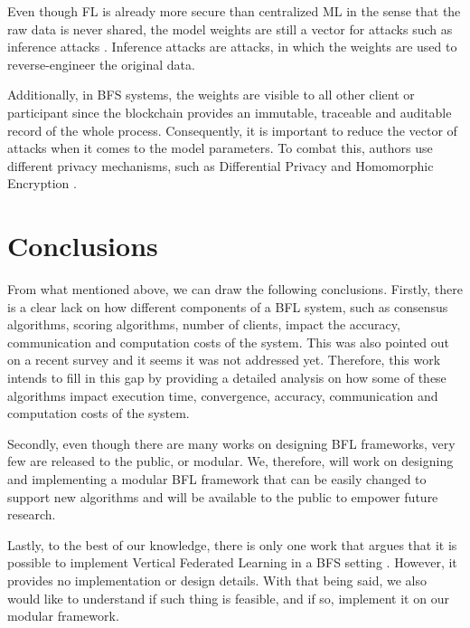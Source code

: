 Even though FL is already more secure than centralized ML in the sense that the raw data is never shared, the model weights are still a vector for attacks such as inference attacks \cite{10.1145/3298981}. Inference attacks are attacks, in which the weights are used to reverse-engineer the original data.

Additionally, in BFS systems, the weights are visible to all other client or participant since the blockchain provides an immutable, traceable and auditable record of the whole process. Consequently, it is important to reduce the vector of attacks when it comes to the model parameters. To combat this, authors use different privacy mechanisms, such as Differential Privacy \cite{10.48550/arxiv.2007.03856, Peyvandi2022, 9170559} and Homomorphic Encryption \cite{8945913, 8894364}.

\section{Conclusions}\label{related_work:conclusions}

From what mentioned above, we can draw the following conclusions. Firstly, there is a clear lack on how different components of a BFL system, such as consensus algorithms, scoring algorithms, number of clients, impact the accuracy, communication and computation costs of the system. This was also pointed out on a recent survey \cite{9403374} and it seems it was not addressed yet. Therefore, this work intends to fill in this gap by providing a detailed analysis on how some of these algorithms impact execution time, convergence, accuracy, communication and computation costs of the system.

Secondly, even though there are many works on designing BFL frameworks, very few are released to the public, or modular. We, therefore, will work on designing and implementing a modular BFL framework that can be easily changed to support new algorithms and will be available to the public to empower future research.

Lastly, to the best of our knowledge, there is only one work that argues that it is possible to implement Vertical Federated Learning in a BFS setting \cite{10.48550/arxiv.1912.04859}. However, it provides no implementation or design details. With that being said, we also would like to understand if such thing is feasible, and if so, implement it on our modular framework.




